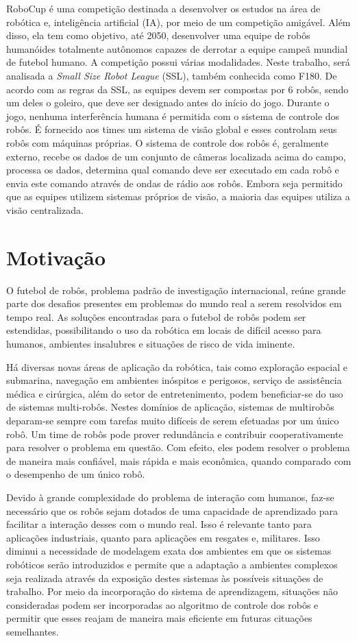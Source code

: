 RoboCup é uma competição destinada a desenvolver os estudos na área de robótica e,
inteligência artificial (IA), por meio de um competição amigável. Além disso, ela tem
como objetivo, até 2050, desenvolver uma equipe de robôs humanóides totalmente
autônomos capazes de derrotar a equipe campeã mundial de futebol humano. A competição
possui várias modalidades. Neste trabalho, será analisada a \textit{Small Size Robot League} (SSL),
também conhecida como F180. De acordo com as regras da SSL, as equipes devem ser
compostas por 6 robôs, sendo um deles o goleiro, que deve ser
designado antes do início do jogo. Durante o jogo, nenhuma interferência humana é
permitida com o sistema de controle dos robôs. É fornecido aos times um sistema de
visão global e esses controlam seus robôs com máquinas próprias. O sistema de controle
dos robôs é, geralmente externo, recebe os dados de um conjunto de câmeras
localizada acima do campo, processa os dados, determina qual comando deve ser executado
em cada robô e envia este comando através de ondas de rádio aos robôs. Embora seja
permitido que as equipes utilizem sistemas próprios de visão, a maioria das equipes utiliza
a visão centralizada.

\section{Motivação}

O futebol de robôs, problema padrão de investigação internacional, reúne grande parte
dos desafios presentes em problemas do mundo real a serem resolvidos em tempo real.
As soluções encontradas para o futebol de robôs podem ser estendidas, possibilitando
o uso da robótica em locais de difícil acesso para humanos, ambientes insalubres e
situações de risco de vida iminente.

Há diversas novas áreas de aplicação da robótica, tais como exploração espacial e submarina,
navegação em ambientes inóspitos e perigosos, serviço de assistência médica
e cirúrgica, além do setor de entretenimento, podem beneficiar-se do uso de sistemas
multi-robôs. Nestes domínios de aplicação, sistemas de multirobôs deparam-se sempre
com tarefas muito difíceis de serem efetuadas por um único robô. Um time de robôs pode
prover redundância e contribuir cooperativamente para resolver o problema em questão.
Com efeito, eles podem resolver o problema de maneira mais confiável, mais rápida e
mais econômica, quando comparado com o desempenho de um único robô.

Devido à grande complexidade do problema de interação com humanos, faz-se necessário
que os robôs sejam dotados de uma capacidade de aprendizado para facilitar a interação
desses com o mundo real. Isso é relevante tanto para aplicações industriais, quanto para
aplicações em resgates e, militares. Isso diminui a necessidade de modelagem
exata dos ambientes em que os sistemas robóticos serão introduzidos e permite que
a adaptação a ambientes complexos seja realizada através da exposição destes sistemas
às possíveis situações de trabalho. Por meio da incorporação do sistema de
aprendizagem, situações não consideradas podem ser incorporadas ao algoritmo de
controle dos robôs e permitir que esses reajam de maneira mais eficiente em futuras
cituações semelhantes.

